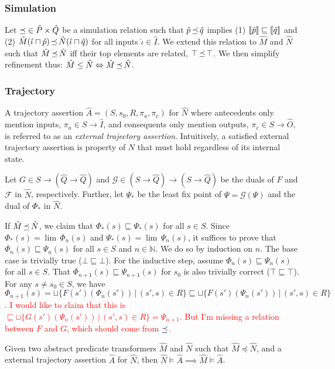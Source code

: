 \subsubsection{Simulation} Let $\operatorname{\preceq} \in \hat P \times \hat Q$ be a simulation relation such that $\hat p \operatorname{\preceq} \hat q$ implies (1) $\llbracket\hat p\rrbracket \sqsubseteq \llbracket\hat q\rrbracket$ and (2) $\hat M(\hat \iota \sqcap \hat p) \operatorname{\preceq} \hat N(\hat \iota \sqcap \hat q)$ for all inputs $\hat \iota \in \hat I$. We extend this relation to $\hat M$ and $\hat N$ such that $\hat M \operatorname{\preceq} \hat N$ iff their top elements are related, $\top \operatorname{\preceq} \top$. We then simplify refinement thus: $\hat M \leq \hat N \Leftrightarrow \hat M \operatorname{\preceq} \hat N$.


\subsubsection{Trajectory} A trajectory assertion $\hat A = (S,s_{0},R,\pi_{a},\pi_{c})$ for $\hat N$ where antecedents only mention inputs, $\pi_{a} \in S \rightarrow \hat I$, and consequents only mention outputs, $\pi_{c} \in S \rightarrow \hat O$, is referred to as an \textit{external trajectory assertion}. Intuitively, a satisfied external trajectory assertion is property of $N$ that must hold regardless of its internal state.

Let $G \in S \rightarrow (\hat Q \rightarrow \hat Q)$ and $\mathcal{G} \in (S \rightarrow \hat Q) \rightarrow (S \rightarrow \hat Q)$ be the duals of $F$ and $\mathcal{F}$ in $\hat N$, respectively. Further, let $\Psi_{*}$ be the least fix point of $\Psi = \mathcal{G}(\Psi)$ and the dual of $\Phi_{*}$ in $\hat N$.

If $\hat M \operatorname{\preceq} \hat N$, we claim that $\Phi_{*}(s) \sqsubseteq \Psi_{*}(s)$ for all $s \in S$. Since $\Phi_{*}(s) = \lim \, \Phi_{n}(s)$ and $\Psi_{*}(s) = \lim \, \Psi_{n}(s)$, it suffices to prove that $\Phi_{n}(s) \sqsubseteq \Psi_{n}(s)$ for all $s \in S$ and $n \in \mathbb{N}$. We do so by induction on $n$. The base case is trivially true ($\bot \sqsubseteq \bot$). For the inductive step, assume $\Phi_{n}(s) \sqsubseteq \Psi_{n}(s)$ for all $s \in S$. That $\Phi_{n+1}(s) \sqsubseteq \Psi_{n+1}(s)$ for $s_{0}$ is also trivially correct ($\top \sqsubseteq \top$). For any $s \neq s_{0} \in S$, we have $\Phi_{n+1}(s) = \sqcup \{ F(s')(\Phi_{n}(s')) \, | \, (s',s) \in R \} \sqsubseteq \sqcup \{ F(s')(\Psi_{n}(s')) \, | \, (s',s) \in R \}$. \textcolor{red}{I would like to claim that this is $\sqsubseteq \sqcup \{ G(s')(\Psi_{n}(s')) \, | \, (s',s) \in R \} = \Psi_{n+1}$. But I'm missing a relation between $F$ and $G$, which should come from $\operatorname{\preceq}$.}

\begin{theorem}
Given two abstract predicate transformers $\hat M$ and $\hat N$ such that $\hat M \preceq \hat N$, and a external trajectory assertion $\hat A$ for $\hat N$, then $\hat N \models \hat A \implies \hat M \models \hat A$.
\end{theorem}

